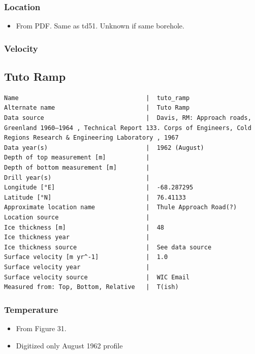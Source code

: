 \documentclass[article,a4paper,times,11pt,twoside]{article}
\begin{document}
\subsubsection{Location}
\label{sec:org7bce8a2}

\begin{itemize}
\item From PDF. Same as td51. Unknown if same borehole.
\end{itemize}

\subsubsection{Velocity}
\label{sec:orgeaf9998}
\clearpage
\subsection{Tuto Ramp}
\label{sec:orgdccf8a1}
\begin{verbatim}
Name                                   |  tuto_ramp
Alternate name                         |  Tuto Ramp
Data source                            |  Davis, RM: Approach roads, Greenland 1960–1964 , Technical Report 133. Corps of Engineers, Cold Regions Research & Engineering Laboratory , 1967 
Data year(s)                           |  1962 (August)
Depth of top measurement [m]           |  
Depth of bottom measurement [m]        |  
Drill year(s)                          |  
Longitude [°E]                         |  -68.287295
Latitude [°N]                          |  76.41133
Approximate location name              |  Thule Approach Road(?)
Location source                        |  
Ice thickness [m]                      |  48
Ice thickness year                     |  
Ice thickness source                   |  See data source
Surface velocity [m yr^-1]             |  1.0
Surface velocity year                  |  
Surface velocity source                |  WIC Email
Measured from: Top, Bottom, Relative   |  T(ish)
\end{verbatim}

\subsubsection{Temperature}
\label{sec:org40252a7}

\begin{itemize}
\item From \textcite{davis_1967} Figure 31.
\item Digitized only August 1962 profile
\end{itemize}
\end{document}
